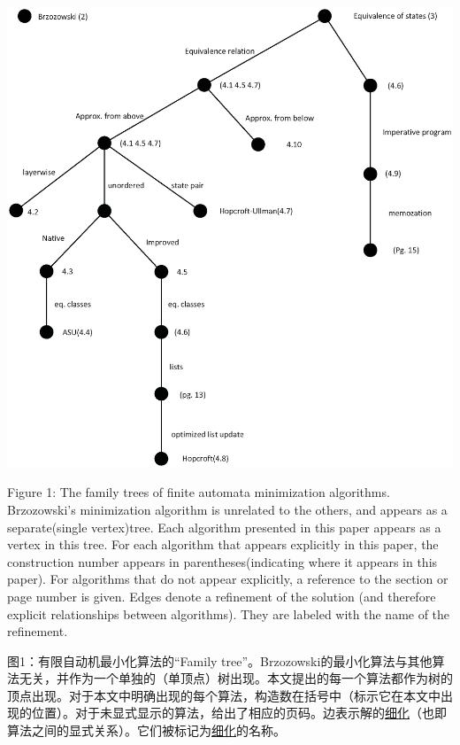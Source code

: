 \includegraphics[width =.9\textwidth]{Family_tree.eps}

Figure 1: The family trees of finite automata minimization algorithms. Brzozowski's minimization algorithm is unrelated to the others, and appears as a separate(single vertex)tree. Each algorithm presented in this paper appears as a vertex in this tree. For each algorithm that appears explicitly in this paper, the construction number appears in parentheses(indicating where it appears in this paper). For algorithms that do not appear explicitly, a reference to the section or page number is given. Edges denote a refinement of the solution (and therefore explicit relationships between algorithms). They are labeled with the name of the refinement.

图1：有限自动机最小化算法的“Family tree”。Brzozowski的最小化算法与其他算法无关，并作为一个单独的（单顶点）树出现。本文提出的每一个算法都作为树的顶点出现。对于本文中明确出现的每个算法，构造数在括号中（标示它在本文中出现的位置）。对于未显式显示的算法，给出了相应的页码。边表示解的\uline{细化}（也即算法之间的显式关系）。它们被标记为\uline{细化}的名称。

